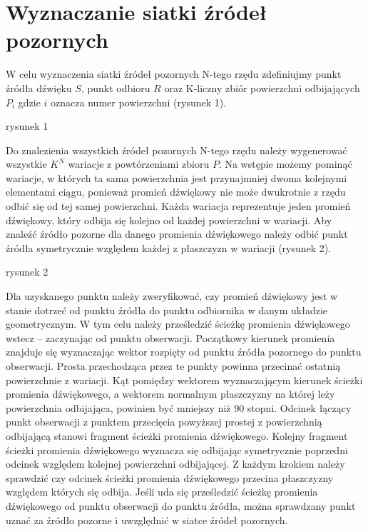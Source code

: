 
\section{Wyznaczanie siatki źródeł pozornych}\label{sec:szp}

W celu wyznaczenia siatki źródeł pozornych N-tego rzędu zdefiniujmy punkt źródła dźwięku $S$, punkt odbioru $R$ oraz K-liczny zbiór powierzchni odbijających $P_i$ gdzie $i$ oznacza numer powierzchni (rysunek 1). 

rysunek 1

Do znalezienia wszystkich źródeł pozornych N-tego rzędu należy wygenerować wszystkie $K^N$ wariacje z powtórzeniami zbioru $P$. Na wstępie możemy pominąć wariacje, w których ta sama powierzchnia jest przynajmniej dwoma kolejnymi elementami ciągu, ponieważ promień dźwiękowy nie może dwukrotnie z rzędu odbić się od tej samej powierzchni. Każda wariacja reprezentuje jeden promień dźwiękowy, który odbija się kolejno od każdej powierzchni w wariacji. Aby znaleźć źródło pozorne dla danego promienia dźwiękowego należy odbić punkt źródła symetrycznie względem każdej z płaszczyzn w wariacji (rysunek 2). 

rysunek 2

Dla uzyskanego punktu należy zweryfikować, czy promień dźwiękowy jest w stanie dotrzeć od punktu źródła do punktu odbiornika w danym układzie geometrycznym. W tym celu należy prześledzić ścieżkę promienia dźwiękowego wstecz – zaczynając od punktu obserwacji. Początkowy kierunek promienia znajduje się wyznaczając wektor rozpięty od punktu źródła pozornego do punktu obserwacji. Prosta przechodząca przez te punkty powinna przecinać ostatnią powierzchnie z wariacji. Kąt pomiędzy wektorem wyznaczającym kierunek ścieżki promienia dźwiękowego, a wektorem normalnym płaszczyzny na której leży powierzchnia odbijająca, powinien być mniejszy niż 90 stopni. Odcinek łączący punkt obserwacji z punktem przecięcia powyższej prostej z powierzchnią odbijającą stanowi fragment ścieżki promienia dźwiękowego. Kolejny  fragment ścieżki promienia dźwiękowego wyznacza się odbijając symetrycznie poprzedni odcinek względem kolejnej powierzchni odbijającej. Z każdym krokiem należy sprawdzić czy odcinek ścieżki promienia dźwiękowego przecina płaszczyzny względem których się odbija. Jeśli uda się prześledzić ścieżkę promienia dźwiękowego od punktu obserwacji do punktu źródła, można sprawdzany punkt uznać za źródło pozorne i uwzględnić w siatce źródeł pozornych.

